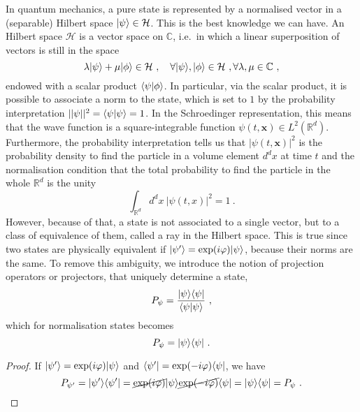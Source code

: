     In quantum mechanics, a pure state is represented by a normalised vector in a (separable) Hilbert space $\vert\psi\rangle \in \mathcal H$. This is the best knowledge we can have. An Hilbert space $\mathcal H$ is a vector space on $\mathbb C$, i.e.~in which a linear superposition of vectors is still in the space 
    \begin{equation*}
        \lambda \vert\psi\rangle + \mu \vert\phi\rangle \in \mathcal H ~, \quad \forall \vert\psi\rangle, \vert\phi\rangle \in \mathcal H ~, \forall \lambda, \mu \in \mathbb C ~, 
    \end{equation*}
    endowed with a scalar product $\langle\psi\vert\phi\rangle$. In particular, via the scalar product, it is possible to associate a norm to the state, which is set to $1$ by the probability interpretation $||\psi||^2 = \langle\psi\vert\psi\rangle = 1$. In the Schroedinger representation, this means that the wave function is a square-integrable function $\psi(t,\mathbf x) \in L^2(\mathbb R^d)$. Furthermore, the probability interpretation tells us that $|\psi(t, \mathbf x)|^2$ is the probability density to find the particle in a volume element $d^d x$ at time $t$ and the normalisation condition that the total probability to find the particle in the whole $\mathbb R^d$ is the unity
    \begin{equation*}
        \int_{\mathbb R^d} d^d x ~ |\psi(t,x)|^2 = 1 ~.
    \end{equation*}
    However, because of that, a state is not associated to a single vector, but to a class of equivalence of them, called a ray in the Hilbert space. This is true since two states are physically equivalent if $\vert\psi'\rangle = \exp(i \varphi) \vert\psi\rangle$, because their norms are the same. To remove this ambiguity, we introduce the notion of projection operators or projectors, that uniquely determine a state, 
    \begin{equation*}
        P_\psi = \frac{\vert\psi\rangle \langle\psi\vert}{\langle\psi\vert\psi\rangle} ~,
    \end{equation*}
    which for normalisation states becomes 
    \begin{equation}\label{proj}
        P_\psi = \vert\psi\rangle \langle\psi\vert ~.
    \end{equation}
    \begin{proof}
        If $\vert\psi'\rangle = \exp(i \varphi) \vert\psi\rangle$ and $\langle\psi'\vert = \exp(- i \varphi) \langle\psi\vert$, we have 
        \begin{equation*}
            P_{\psi'} = \vert\psi'\rangle \langle\psi'\vert = \cancel{\exp(i \varphi)} \vert\psi\rangle \cancel{\exp(- i \varphi)} \langle\psi\vert = \vert\psi\rangle \langle\psi\vert = P_\psi ~.
        \end{equation*}
    \end{proof}

